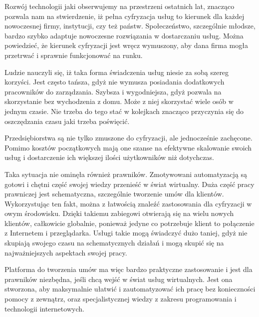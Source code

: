 Rozwój technologii jaki obserwujemy na przestrzeni ostatnich lat, znacząco pozwala nam na stwierdzenie, iż pełna cyfryzacja usług to kierunek dla każdej nowoczesnej firmy, instytucji, czy też państw. Społeczeństwo, szczególnie młodsze, bardzo szybko adaptuje nowoczesne rozwiązania w dostarczaniu usług. Można powiedzieć, że kierunek cyfryzacji jest wręcz wymuszony, aby dana firma mogła przetrwać i sprawnie funkcjonować na runku. 

Ludzie nauczyli się, iż taka forma świadczenia usług niesie za sobą szereg korzyści. Jest często tańsza, gdyż nie wymusza posiadania dodatkowych pracowników do zarządzania. Szybsza i wygodniejsza, gdyż pozwala na skorzystanie bez wychodzenia z domu. Może z niej skorzystać wiele osób w jednym czasie. Nie trzeba do tego stać w kolejkach znacząco przyczynia się do oszczędzania czasu jaki trzeba poświęcić. 

Przedsiębiorstwa są nie tylko zmuszone do cyfryzacji, ale jednocześnie zachęcone. Pomimo kosztów początkowych mają one szanse na efektywne skalowanie swoich usług i dostarczenie ich większej ilości użytkowników niż dotychczas. 

Taka sytuacja nie ominęła również prawników. Zmotywowani automatyzacją są gotowi i chętni część swojej wiedzy przenieść w świat wirtualny. Duża część pracy prawniczej jest schematyczna, szczególnie tworzenie umów dla klientów. Wykorzystując ten fakt, można z łatwością znaleźć zastosowania dla cyfryzacji w owym środowisku. Dzięki takiemu zabiegowi otwierają się na wielu nowych klientów, całkowicie globalnie, ponieważ jedyne co potrzebuje klient to połączenie z Internetem i przeglądarka. Usługi takie mogą świadczyć dużo taniej, gdyż nie skupiają swojego czasu na schematycznych działań i mogą skupić się na najważniejszych aspektach swojej pracy. 

Platforma do tworzenia umów ma więc bardzo praktyczne zastosowanie i jest dla prawników niezbędna, jeśli chcą wejść w świat usług wirtualnych. Jest ona stworzona, aby maksymalnie ułatwić i zautomatyzować ich pracę bez konieczności pomocy z zewnątrz, oraz specjalistycznej wiedzy z zakresu programowania i technologii internetowych. 
